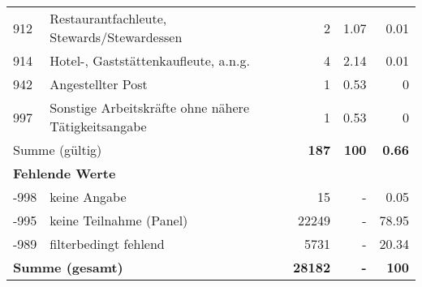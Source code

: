 \begin{longtable}{lXrrr}
        912 & \multicolumn{1}{X}{Restaurantfachleute, Stewards/Stewardessen} & %
          \num{2} &
          \num[round-mode=places,round-precision=2]{1.07} &
          \num[round-mode=places,round-precision=2]{0.01} \\

        914 & \multicolumn{1}{X}{Hotel-, Gaststättenkaufleute, a.n.g.} & %
          \num{4} &
          \num[round-mode=places,round-precision=2]{2.14} &
          \num[round-mode=places,round-precision=2]{0.01} \\

        942 & \multicolumn{1}{X}{Angestellter Post} & %
          \num{1} &
          \num[round-mode=places,round-precision=2]{0.53} &
          \num[round-mode=places,round-precision=2]{0} \\

        997 & \multicolumn{1}{X}{Sonstige Arbeitskräfte ohne nähere Tätigkeitsangabe} & %
          \num{1} &
          \num[round-mode=places,round-precision=2]{0.53} &
          \num[round-mode=places,round-precision=2]{0} \\

     \midrule
     \multicolumn{2}{l}{Summe (gültig)} &
       \textbf{\num{187}} &
     \textbf{100} &
       \textbf{\num[round-mode=places,round-precision=2]{0.66}} \\
     \multicolumn{5}{l}{\textbf{Fehlende Werte}}\\
       -998 &
       keine Angabe &
         \num{15} &
        - &
         \num[round-mode=places,round-precision=2]{0.05} \\
       -995 &
       keine Teilnahme (Panel) &
         \num{22249} &
        - &
         \num[round-mode=places,round-precision=2]{78.95} \\
       -989 &
       filterbedingt fehlend &
         \num{5731} &
        - &
         \num[round-mode=places,round-precision=2]{20.34} \\
     \midrule
     \multicolumn{2}{l}{\textbf{Summe (gesamt)}} &
          \textbf{\num{28182}} &
        \textbf{-} &
        \textbf{100} \\
     \bottomrule
     \end{longtable}
     
